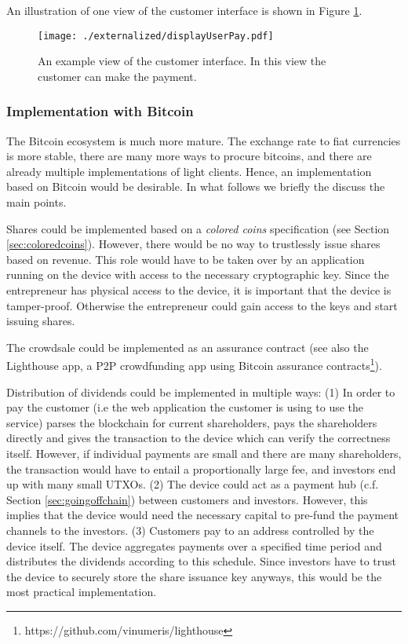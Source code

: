 An illustration of one view of the customer interface is shown in Figure \ref{fig:payview}.

\begin{figure}
 \centering
 \texttt{[image: ./externalized/displayUserPay.pdf]}
 \caption{An example view of the customer interface. In this view the customer can make the payment.}
 \label{fig:payview}
 \end{figure}

 
\subsubsection{Implementation with Bitcoin}

The Bitcoin ecosystem is much more mature. The exchange rate to fiat currencies is more stable, there are many more ways to procure bitcoins, and there are already multiple implementations of light clients. Hence, an implementation based on Bitcoin would be desirable. In what follows we briefly the discuss the main points.

Shares could be implemented based on a \emph{colored coins} specification (see Section \ref{sec:coloredcoins}). However, there would be no way to trustlessly issue shares based on revenue. This role would have to be taken over by an application running on the device with access to the necessary cryptographic key. Since the entrepreneur has physical access to the device, it is important that the device is tamper-proof. Otherwise the entrepreneur could gain access to the keys and start issuing shares.

The crowdsale could be implemented as an assurance contract \parencite{smartcontr} (see also the Lighthouse app, a \ac{P2P} crowdfunding app using Bitcoin assurance contracts\footnote{https://github.com/vinumeris/lighthouse}).

 Distribution of dividends could be implemented in multiple ways: (1) In order to pay the customer (i.e the web application the customer is using to use the service) parses the blockchain for current shareholders, pays the shareholders directly and gives the transaction to the device which can verify the correctness itself. However, if individual payments are small and there are many shareholders, the transaction would have to entail a proportionally large fee, and investors end up with many small \ac{UTXO}s. (2) The device could act as a payment hub (c.f. Section \ref{sec:goingoffchain}) between customers and investors. However, this implies that the device would need the necessary capital to pre-fund the payment channels to the investors. (3) Customers pay to an address controlled by the device itself. The device aggregates payments over a specified time period and distributes the dividends according to this schedule. Since investors have to trust the device to securely store the share issuance key anyways, this would be the most practical implementation. 

